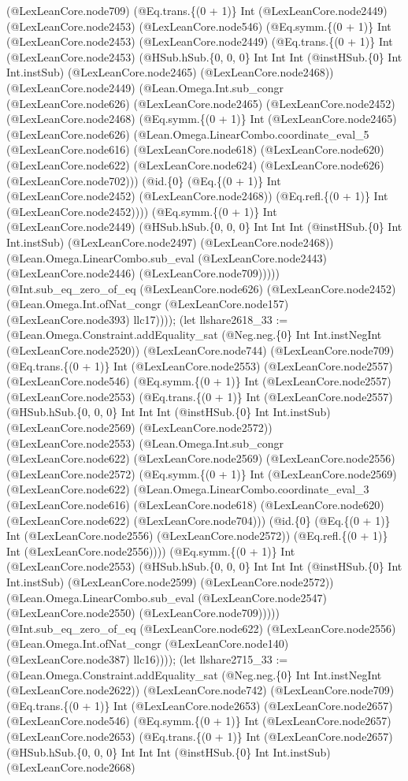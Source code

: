 \documentclass[11pt]{article}
\begin{document}
(@LexLeanCore.node709) (@Eq.trans.\{(0 + 1)\} Int (@LexLeanCore.node2449) (@LexLeanCore.node2453) (@LexLeanCore.node546) (@Eq.symm.\{(0 + 1)\} Int (@LexLeanCore.node2453) (@LexLeanCore.node2449) (@Eq.trans.\{(0 + 1)\} Int (@LexLeanCore.node2453) (@HSub.hSub.\{0, 0, 0\} Int Int Int (@instHSub.\{0\} Int Int.instSub) (@LexLeanCore.node2465) (@LexLeanCore.node2468)) (@LexLeanCore.node2449) (@Lean.Omega.Int.sub\_congr (@LexLeanCore.node626) (@LexLeanCore.node2465) (@LexLeanCore.node2452) (@LexLeanCore.node2468) (@Eq.symm.\{(0 + 1)\} Int (@LexLeanCore.node2465) (@LexLeanCore.node626) (@Lean.Omega.LinearCombo.coordinate\_eval\_5 (@LexLeanCore.node616) (@LexLeanCore.node618) (@LexLeanCore.node620) (@LexLeanCore.node622) (@LexLeanCore.node624) (@LexLeanCore.node626) (@LexLeanCore.node702))) (@id.\{0\} (@Eq.\{(0 + 1)\} Int (@LexLeanCore.node2452) (@LexLeanCore.node2468)) (@Eq.refl.\{(0 + 1)\} Int (@LexLeanCore.node2452)))) (@Eq.symm.\{(0 + 1)\} Int (@LexLeanCore.node2449) (@HSub.hSub.\{0, 0, 0\} Int Int Int (@instHSub.\{0\} Int Int.instSub) (@LexLeanCore.node2497) (@LexLeanCore.node2468)) (@Lean.Omega.LinearCombo.sub\_eval (@LexLeanCore.node2443) (@LexLeanCore.node2446) (@LexLeanCore.node709))))) (@Int.sub\_eq\_zero\_of\_eq (@LexLeanCore.node626) (@LexLeanCore.node2452) (@Lean.Omega.Int.ofNat\_congr (@LexLeanCore.node157) (@LexLeanCore.node393) llc17)))); (let llshare2618\_33 := (@Lean.Omega.Constraint.addEquality\_sat (@Neg.neg.\{0\} Int Int.instNegInt (@LexLeanCore.node2520)) (@LexLeanCore.node744) (@LexLeanCore.node709) (@Eq.trans.\{(0 + 1)\} Int (@LexLeanCore.node2553) (@LexLeanCore.node2557) (@LexLeanCore.node546) (@Eq.symm.\{(0 + 1)\} Int (@LexLeanCore.node2557) (@LexLeanCore.node2553) (@Eq.trans.\{(0 + 1)\} Int (@LexLeanCore.node2557) (@HSub.hSub.\{0, 0, 0\} Int Int Int (@instHSub.\{0\} Int Int.instSub) (@LexLeanCore.node2569) (@LexLeanCore.node2572)) (@LexLeanCore.node2553) (@Lean.Omega.Int.sub\_congr (@LexLeanCore.node622) (@LexLeanCore.node2569) (@LexLeanCore.node2556) (@LexLeanCore.node2572) (@Eq.symm.\{(0 + 1)\} Int (@LexLeanCore.node2569) (@LexLeanCore.node622) (@Lean.Omega.LinearCombo.coordinate\_eval\_3 (@LexLeanCore.node616) (@LexLeanCore.node618) (@LexLeanCore.node620) (@LexLeanCore.node622) (@LexLeanCore.node704))) (@id.\{0\} (@Eq.\{(0 + 1)\} Int (@LexLeanCore.node2556) (@LexLeanCore.node2572)) (@Eq.refl.\{(0 + 1)\} Int (@LexLeanCore.node2556)))) (@Eq.symm.\{(0 + 1)\} Int (@LexLeanCore.node2553) (@HSub.hSub.\{0, 0, 0\} Int Int Int (@instHSub.\{0\} Int Int.instSub) (@LexLeanCore.node2599) (@LexLeanCore.node2572)) (@Lean.Omega.LinearCombo.sub\_eval (@LexLeanCore.node2547) (@LexLeanCore.node2550) (@LexLeanCore.node709))))) (@Int.sub\_eq\_zero\_of\_eq (@LexLeanCore.node622) (@LexLeanCore.node2556) (@Lean.Omega.Int.ofNat\_congr (@LexLeanCore.node140) (@LexLeanCore.node387) llc16)))); (let llshare2715\_33 := (@Lean.Omega.Constraint.addEquality\_sat (@Neg.neg.\{0\} Int Int.instNegInt (@LexLeanCore.node2622)) (@LexLeanCore.node742) (@LexLeanCore.node709) (@Eq.trans.\{(0 + 1)\} Int (@LexLeanCore.node2653) (@LexLeanCore.node2657) (@LexLeanCore.node546) (@Eq.symm.\{(0 + 1)\} Int (@LexLeanCore.node2657) (@LexLeanCore.node2653) (@Eq.trans.\{(0 + 1)\} Int (@LexLeanCore.node2657) (@HSub.hSub.\{0, 0, 0\} Int Int Int (@instHSub.\{0\} Int Int.instSub) (@LexLeanCore.node2668) 
\end{document}
